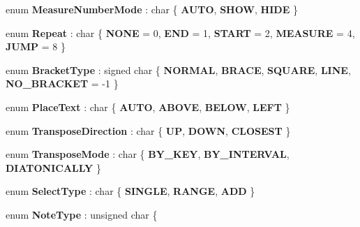 \begin{DoxyCompactItemize}
\mbox{\label{namespace_ms_abf5b57a345dcca09db0e0c170b577e83}} 
enum {\bfseries Measure\+Number\+Mode} \+: char \{ {\bfseries A\+U\+TO}, 
{\bfseries S\+H\+OW}, 
{\bfseries H\+I\+DE}
 \}
\item 
\mbox{\label{namespace_ms_abe3194b000e9681e7d24f72a3b4184b5}} 
enum {\bfseries Repeat} \+: char \{ \newline
{\bfseries N\+O\+NE} = 0, 
{\bfseries E\+ND} = 1, 
{\bfseries S\+T\+A\+RT} = 2, 
{\bfseries M\+E\+A\+S\+U\+RE} = 4, 
\newline
{\bfseries J\+U\+MP} = 8
 \}
\item 
\mbox{\label{namespace_ms_a4c0a2128d0477020d4faf110cc01e3ab}} 
enum {\bfseries Bracket\+Type} \+: signed char \{ \newline
{\bfseries N\+O\+R\+M\+AL}, 
{\bfseries B\+R\+A\+CE}, 
{\bfseries S\+Q\+U\+A\+RE}, 
{\bfseries L\+I\+NE}, 
\newline
{\bfseries N\+O\+\_\+\+B\+R\+A\+C\+K\+ET} = -\/1
 \}
\item 
\mbox{\label{namespace_ms_a239e390cba4ba2b19296c2995da44976}} 
enum {\bfseries Place\+Text} \+: char \{ {\bfseries A\+U\+TO}, 
{\bfseries A\+B\+O\+VE}, 
{\bfseries B\+E\+L\+OW}, 
{\bfseries L\+E\+FT}
 \}
\item 
\mbox{\label{namespace_ms_a369b0f81ac06af55925432f09ee33e57}} 
enum {\bfseries Transpose\+Direction} \+: char \{ {\bfseries UP}, 
{\bfseries D\+O\+WN}, 
{\bfseries C\+L\+O\+S\+E\+ST}
 \}
\item 
\mbox{\label{namespace_ms_a438ed2617c5504f4a052bbf59656dbc5}} 
enum {\bfseries Transpose\+Mode} \+: char \{ {\bfseries B\+Y\+\_\+\+K\+EY}, 
{\bfseries B\+Y\+\_\+\+I\+N\+T\+E\+R\+V\+AL}, 
{\bfseries D\+I\+A\+T\+O\+N\+I\+C\+A\+L\+LY}
 \}
\item 
\mbox{\label{namespace_ms_a1066451ad9dc9959bedb76978f4f30c8}} 
enum {\bfseries Select\+Type} \+: char \{ {\bfseries S\+I\+N\+G\+LE}, 
{\bfseries R\+A\+N\+GE}, 
{\bfseries A\+DD}
 \}
\item 
\mbox{\label{namespace_ms_a3cbef2aae56ebc254401dff31a0680a2}} 
enum {\bfseries Note\+Type} \+: unsigned char \{ \newline

\end{DoxyCompactItemize}
